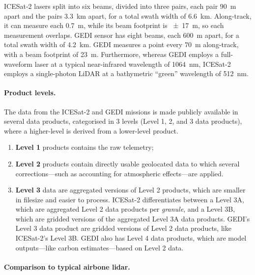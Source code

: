 %

ICESat-2 lasers split into six beams, divided into three pairs, each pair \qty{90}{m} apart and the pairs \qty{3.3}{km} apart, for a total swath width of \qty{6.6}{km}.
Along-track, it can measure each \qty{0.7}{m}, while its beam footprint is \qty{\pm17}{m}, so each measurement overlaps.
GEDI sensor has eight beams, each \qty{600}{m} apart, for a total swath width of \qty{4.2}{km}.
GEDI measures a point every \qty{70}{m} along-track, with a beam footprint of \qty{23}{m}.
Furthermore, whereas GEDI employs a full-waveform laser at a typical near-infrared wavelength of \qty{1064}{nm}, ICESat-2 employs a single-photon LiDAR at a bathymetric ``green'' wavelength of \qty{512}{nm}.


\paragraph{Product levels.}
The data from the ICESat-2 and GEDI missions is made publicly available in several data products, categorised in 3 levels (Level 1, 2, and 3 data products), where a higher-level is derived from a lower-level product.
\begin{enumerate}
  \item \textbf{Level 1} products contains the raw telemetry;
  \item \textbf{Level 2} products contain directly usable geolocated data to which several corrections---such as accounting for atmospheric effects---are applied.
  \item \textbf{Level 3} data are aggregated versions of Level 2 products, which are smaller in filesize and easier to process.
        ICESat-2 differentiates between a Level 3A, which are aggregated Level 2 data products per \emph{granule}, and a Level 3B, which are gridded versions of the aggregated Level 3A data products.
        GEDI's Level 3 data product are gridded versions of Level 2 data products, like ICESat-2's Level 3B.
        GEDI also has Level 4 data products, which are model outputs---like carbon estimates---based on Level 2 data.
\end{enumerate}


\paragraph{Comparison to typical airbone lidar.}

